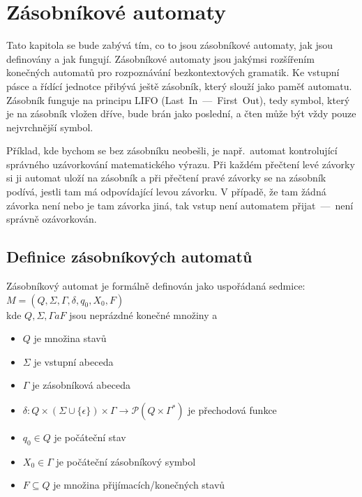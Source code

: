 \chapter{Zásobníkové automaty}\label{chap:PushdownAutomata}

Tato kapitola se bude zabývá tím, co to jsou zásobníkové automaty, jak jsou definovány a jak fungují. Zásobníkové automaty jsou jakýmsi rozšířením konečných automatů pro rozpoznávání bezkontextových gramatik. Ke vstupní pásce a řídící jednotce přibývá ještě zásobník, který slouží jako paměť automatu. Zásobník funguje na principu LIFO (Last~In~---~First~Out), tedy symbol, který je na zásobník vložen dříve, bude brán jako poslední, a čten může být vždy pouze nejvrchnější symbol.

Příklad, kde bychom se bez zásobníku neobešli, je např.~automat kontrolující správného uzávorkování matematického výrazu. Při každém přečtení levé závorky si ji automat uloží na zásobník a při přečtení pravé závorky se na zásobník podívá, jestli tam má odpovídající levou závorku. V případě, že tam žádná závorka není nebo je tam závorka jiná, tak vstup není automatem přijat~---~není správně ozávorkován.

\section{Definice zásobníkových automatů}\label{sec:DefinitonOfPDA}

Zásobníkový automat je formálně definován jako uspořádaná sedmice:\\
\indent\emph{$M = (Q, \Sigma, \Gamma, \delta, q_0, X_0, F)$}\\
kde $Q, \Sigma, \Gamma a F$ jsou neprázdné konečné množiny a 

\begin{itemize}
    \item $Q$ je množina stavů
    \item $\Sigma$ je vstupní abeceda
    \item $\Gamma$ je zásobníková abeceda
    \item $\delta : Q \times (\Sigma \cup \{\epsilon\}) \times \Gamma \rightarrow \mathcal{P}(Q \times \Gamma^*)$ je přechodová funkce
    \item $q_0 \in Q$ je počáteční stav
    \item $X_0 \in \Gamma$ je počáteční zásobníkový symbol
    \item $F \subseteq Q$ je množina přijímacích/konečných stavů
\end{itemize}

